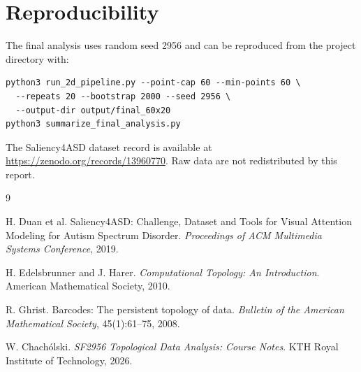 \documentclass[11pt,a4paper]{article}
\begin{document}
\section*{Reproducibility}

The final analysis uses random seed 2956 and can be reproduced from the project
directory with:
\begin{verbatim}
python3 run_2d_pipeline.py --point-cap 60 --min-points 60 \
  --repeats 20 --bootstrap 2000 --seed 2956 \
  --output-dir output/final_60x20
python3 summarize_final_analysis.py
\end{verbatim}
The Saliency4ASD dataset record is available at
\url{https://zenodo.org/records/13960770}.  Raw data are not redistributed by
this report.

\begin{thebibliography}{9}

H. Duan et al.
\newblock Saliency4ASD: Challenge, Dataset and Tools for Visual Attention
Modeling for Autism Spectrum Disorder.
\newblock \emph{Proceedings of ACM Multimedia Systems Conference}, 2019.

\bibitem{edelsbrunner2010}
H. Edelsbrunner and J. Harer.
\newblock \emph{Computational Topology: An Introduction}.
\newblock American Mathematical Society, 2010.

R. Ghrist.
\newblock Barcodes: The persistent topology of data.
\newblock \emph{Bulletin of the American Mathematical Society}, 45(1):61--75,
2008.

W. Chach\'olski.
\newblock \emph{SF2956 Topological Data Analysis: Course Notes}.
\newblock KTH Royal Institute of Technology, 2026.

\end{thebibliography}
\end{document}
